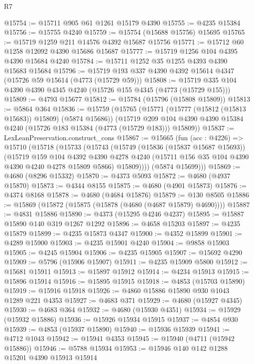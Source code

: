 \begin{lexlean}{R7}
\begin{coremodule}
@15754 := @15711 @905 @61 @1261 @15179 @4390
@15755 := @4235 @15384
@15756 := @15755 @4240
@15759 := @15754 (@15688 @15756) @15695
@15765 := @15719 @1259 @211 @14576 @4392 @15687 @15756
@15771 := @15712 @60 @1258 @12092 @4390 @15686 @15687
@15777 := @15719 @1256 @104 @4395 @4390 @15684 @4240
@15784 := @15711 @1252 @35 @1255 @4393 @4390 @15683 @15684
@15796 := @15719 @193 @337 @4390 @4392 @15614 @4347 (@15726 @59 @15614 (@4773 (@15729 @59)))
@15808 := @15719 @335 @104 @4390 @4390 @4345 @4240 (@15726 @155 @4345 (@4773 (@15729 @155)))
@15809 := @4793 @15677
@15812 := @15784 (@15796 (@15808 @15809))
@15813 := @5864 @364
@15836 := @15759
    (@15765
      (@15771 (@15777 (@15812 (@15813 @15683)) @15809) (@5874 @15686))
      (@15719 @209 @104 @4390 @4390 @15384 @4240 (@15726 @183 @15384 (@4773 (@15729 @183))) @15809))
@15837 := LexLeanPreservation.construct_cons
@15867 := @15665
    (fun (acc : @4226) =>
    @15710
      (@15718
        (@15733
          (@15743
            (@15749
              (@15836 (@15837 @15687 @15693))
              (@15719
                @159
                @104
                @4392
                @4390
                @4278
                @4240
                (@15711 @156 @35 @104 @4390 @4390 @4240 @4278 @15809 @5866)
                @15809))))
        (@5874 @15699)))
@15869 := @4680 (@8296 @15332)
@15870 := @4373 @5093
@15872 := @4680 (@4937 @15870)
@15873 := @4344 @8155
@15875 := @4680 (@4901 @15873)
@15876 := @4374 @8168
@15878 := @4680 (@4684 @15876)
@15879 := @130 @8505
@15886 := @15869 (@15872 (@15875 (@15878 (@4680 (@4687 @15879) @4690))))
@15887 := @4831 @15886
@15890 := @4373 (@15295 @4246 @4237)
@15895 := @15887 @15890 @140 @319 @1267 @1292
@15896 := @4658 @15203
@15897 := @4235 @15879
@15899 := @4235 @15873 @4347
@15900 := @4352 @15899
@15901 := @4289 @15900
@15903 := @4235 @15901 @4240
@15904 := @9858 @15903
@15905 := @4245 @15904
@15906 := @4235 @15905
@15907 := @15692 @4290
@15909 := @5796 (@15906 @15907)
@15911 := @4235 @15909 @5800
@15912 := @15681 @15911
@15913 := @15897 @15912
@15914 := @4234 @15913
@15915 := @15896 @15914
@15916 := @15895 @15915
@15918 := @4853 (@15703 @15890)
@15919 := @15916 @15918
@15926 := @4860 @15886 @15890 @930 @1043 @1289 @221 @4353
@15927 := @4683 @371
@15929 := @4680 (@15927 @4345)
@15930 := @4683 @364
@15932 := @4680 (@15930 @4351)
@15934 := @15929 (@15932 @15886)
@15936 := @15926 @15934 @15915
@15937 := @4854 @930
@15939 := @4853 (@15937 @15890)
@15940 := @15936 @15939
@15941 := @4712 @1043
@15942 := @15941 @4353
@15945 := @15940 (@4711 (@15942 @15886))
@15946 := @5788 @15934
@15953 := @15946 @140 @142 @1288 @15201 @4390 @15913 @15914

\end{coremodule}
\end{lexlean}
